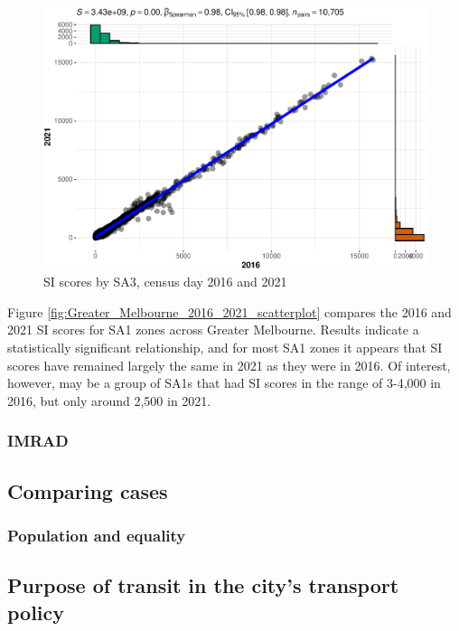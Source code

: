 \documentclass[preprint, 3p,
authoryear]{elsarticle} %
\begin{document}
\begin{figure}
\centering
\includegraphics{Leveraging_GTFS_to_assess_transit_supply_Transport_Geography_files/figure-latex/Greater_Melbourne_2016_2021_scatterplot-1.pdf}
\caption{SI scores by SA3, census day 2016 and 2021}
\end{figure}

Figure \ref{fig:Greater_Melbourne_2016_2021_scatterplot} compares the
2016 and 2021 SI scores for SA1 zones across Greater Melbourne. Results
indicate a statistically significant relationship, and for most SA1
zones it appears that SI scores have remained largely the same in 2021
as they were in 2016. Of interest, however, may be a group of SA1s that
had SI scores in the range of 3-4,000 in 2016, but only around 2,500 in
2021.

\subsubsection{IMRAD}\label{imrad}

\subsection{Comparing cases}\label{comparing-cases}

\subsubsection{Population and equality}\label{population-and-equality}

\subsection{Purpose of transit in the city's transport
policy}\label{purpose-of-transit-in-the-citys-transport-policy}
\end{document}
